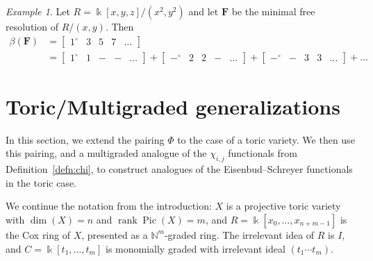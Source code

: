 \documentclass[12pt]{amsart}
\theoremstyle{definition}
\theoremstyle{remark}
\newtheorem{example}[lemma]{Example}
\newcommand{\Pic}{\operatorname{Pic}}
\newcommand{\kk}{\Bbbk}
\newcommand{\rank}{\operatorname{rank}}
\newcommand{\FF}{\mathbf{F}}
\newcommand{\zp}{\circ}
\begin{document}

\begin{example}
Let $R=\kk[x,y,z]/(x^2,y^2)$ and let $\FF$ be the minimal free resolution of $R/(x,y)$.  Then
\begin{align*}
\beta(\FF)&=\begin{bmatrix}1^\zp&3&5&7&\dots \end{bmatrix}\\
&=\begin{bmatrix}1^\zp&1&-&-&\dots \end{bmatrix}+\begin{bmatrix}-^\zp&2&2&-&\dots \end{bmatrix}+\begin{bmatrix}-^\zp&-&3&3&\dots \end{bmatrix}+\dots
\end{align*}
\end{example}




\section{Toric/Multigraded generalizations}\label{sec:toric}
In this section, we extend the pairing $\Phi$ to the case of a toric variety.  We then use this pairing, and a multigraded analogue of the $\chi_{i,j}$ functionals from Definition~\ref{defn:chi}, to construct analogues of the Eisenbud--Schreyer functionals in the toric case.

We continue the notation from the introduction: $X$ is a projective toric variety with $\dim(X)=n$ and $\rank \Pic(X)=m$, and $R=\kk[x_0,\dots,x_{n+m-1}]$ is the Cox ring of $X$, presented as a $\mathbb N^m$-graded ring.  The irrelevant idea of $R$ is $I$, and $C= \kk[t_1, \dots, t_m]$ is monomially graded with irrelevant ideal $(t_1\cdots t_m)$.
\end{document}
